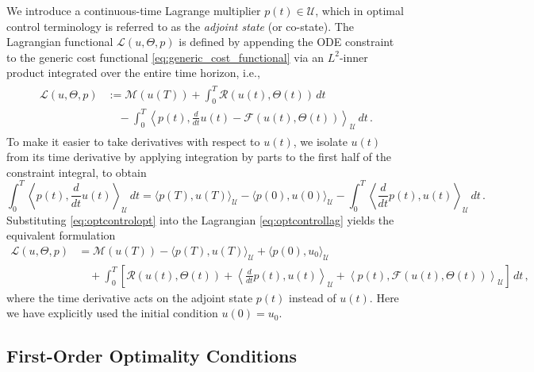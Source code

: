 We introduce a continuous-time Lagrange multiplier $p(t) \in \mathcal{U}$, which in optimal control terminology is referred to as the \emph{adjoint state} (or co-state). The Lagrangian functional $\mathcal{L}(u, \Theta, p)$ is defined by appending the ODE constraint to the generic cost functional \eqref{eq:generic_cost_functional} via an $L^2$-inner product integrated over the entire time horizon, i.e.,
\begin{align}
    \begin{split}
    \mathcal{L}(u, \Theta, p) &:= \mathcal{M}\left(u(T)\right) + \int_0^T \mathcal{R}\left(u(t), \Theta(t)\right) \, dt \\
    &\quad - \int_0^T \left\langle p(t), \frac{d}{dt}u(t) - \mathcal{F}\left(u(t), \Theta(t)\right) \right\rangle_{\mathcal{U}} \, dt \, .
    \end{split}\label{eq:optcontrollag}
\end{align}
To make it easier to take derivatives with respect to $u(t)$, we isolate $u(t)$ from its time derivative by applying integration by parts to the first half of the constraint integral, to obtain
\begin{equation}
    \int_0^T \left\langle p(t), \frac{d}{dt}u(t) \right\rangle_{\mathcal{U}} \, dt = \langle p(T), u(T) \rangle_{\mathcal{U}} - \langle p(0), u(0) \rangle_{\mathcal{U}} - \int_0^T \left\langle \frac{d}{dt}p(t), u(t) \right\rangle_{\mathcal{U}} \, dt \, .\label{eq:optcontrolopt}
\end{equation}
Substituting \eqref{eq:optcontrolopt} into the Lagrangian \eqref{eq:optcontrollag} yields the equivalent formulation
\begin{align*}
    \mathcal{L}(u, \Theta, p) &= \mathcal{M}\left(u(T)\right) - \langle p(T), u(T) \rangle_{\mathcal{U}} + \langle p(0), u_0 \rangle_{\mathcal{U}} \\
    &\quad + \int_0^T \left[ \mathcal{R}\left(u(t), \Theta(t)\right) + \left\langle \frac{d}{dt}p(t), u(t) \right\rangle_{\mathcal{U}} + \left\langle p(t), \mathcal{F}\left(u(t), \Theta(t)\right) \right\rangle_{\mathcal{U}} \right] \, dt \, ,
\end{align*}
where the time derivative acts on the adjoint state $p(t)$ instead of $u(t)$. Here we have explicitly used the initial condition $u(0) = u_0$.

\subsection{First-Order Optimality Conditions}

